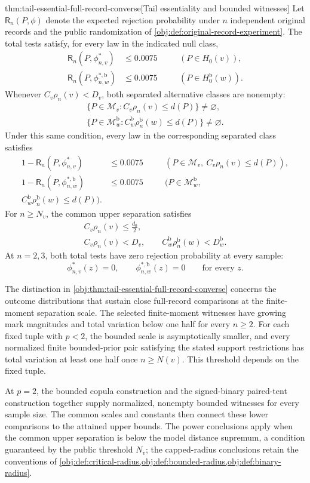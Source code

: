 \begin{theoremv}{thm:tail-essential-full-record-converse}[Tail essentiality and bounded witnesses]
Let \(\mathsf R_n(P,\phi)\) denote the expected rejection probability under \(n\) independent original records and the public randomization of
\cref{obj:def:original-record-experiment}. The total tests satisfy, for every law in the indicated null class,
\[
\begin{aligned}
\mathsf R_n(P,\phi^*_{n,v})&\le0.0075
&&\quad(P\in H_0(v)),\\
\mathsf R_n(P,\phi^{*,\mathrm b}_{n,w})&\le0.0075
&&\quad(P\in H_0^{\mathrm b}(w)).
\end{aligned}
\]
Whenever \(C_v\rho_n(v)<D_v\), both separated alternative classes are nonempty:
\[
\begin{gathered}
\{P\in\mathcal M_v:C_v\rho_n(v)\le d(P)\}\ne\varnothing,\\
\{P\in\mathcal M^{\mathrm b}_w:
C_w^{\mathrm b}\rho_n^{\mathrm b}(w)\le d(P)\}\ne\varnothing.
\end{gathered}
\]
Under this same condition, every law in the corresponding separated class satisfies
\[
\begin{aligned}
1-\mathsf R_n(P,\phi^*_{n,v})&\le0.0075
&&\quad(P\in\mathcal M_v,\ C_v\rho_n(v)\le d(P)),\\
1-\mathsf R_n(P,\phi^{*,\mathrm b}_{n,w})&\le0.0075
&&\quad(P\in\mathcal M^{\mathrm b}_w,\\
C_w^{\mathrm b}\rho_n^{\mathrm b}(w)\le d(P)).
\end{aligned}
\]
For \(n\ge N_v\), the common upper separation satisfies
\[
\begin{gathered}
C_v\rho_n(v)\le\frac{d_0}{2},\\
C_v\rho_n(v)<D_v,
\qquad
C_w^{\mathrm b}\rho_n^{\mathrm b}(w)<D_w^{\mathrm b}.
\end{gathered}
\]
At \(n=2,3\), both total tests have zero rejection probability at every sample:
\[
\phi^*_{n,v}(z)=0,
\qquad
\phi^{*,\mathrm b}_{n,w}(z)=0
\qquad\text{for every }z.
\]
\end{theoremv}

The distinction in \cref{obj:thm:tail-essential-full-record-converse} concerns the outcome distributions that sustain close full-record comparisons at the finite-moment separation scale. The selected finite-moment witnesses have growing mark magnitudes and total variation below one half for every \(n\ge2\). For each fixed tuple with \(p<2\), the bounded scale is asymptotically smaller, and every normalized finite bounded-prior pair satisfying the stated support restrictions has total variation at least one half once \(n\ge N(v)\). This threshold depends on the fixed tuple.

At \(p=2\), the bounded copula construction and the signed-binary paired-tent construction together supply normalized, nonempty bounded witnesses for every sample size. The common scales and constants then connect these lower comparisons to the attained upper bounds. The power conclusions apply when the common upper separation is below the model distance supremum, a condition guaranteed by the public threshold \(N_v\); the capped-radius conclusions retain the conventions of \cref{obj:def:critical-radius,obj:def:bounded-radius,obj:def:binary-radius}.
